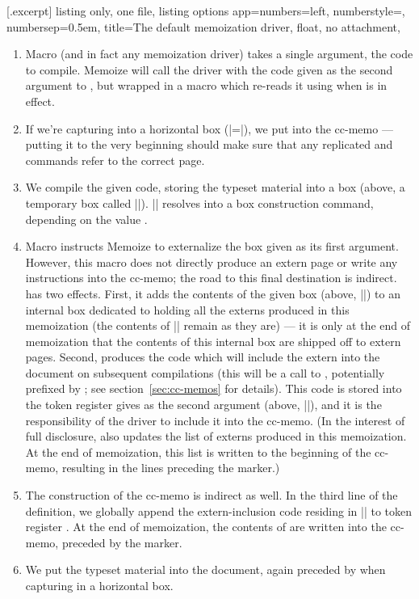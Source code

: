 \documentclass[a4paper,11pt]{article}
\begin{document}
[.excerpt]{%
  listing only, one file,
  listing options app={numbers=left, numberstyle=\tiny, numbersep=0.5em},
  title=The default memoization driver,
  float, no attachment,
}

\begin{enumerate}
\item Macro  (and in fact any memoization
  driver) takes a single argument, the code to compile.  Memoize will call the
  driver with the code given as the second argument to , but
  wrapped in a macro which re-reads it using  when
   is in effect.
\item If we're capturing into a horizontal box
  (|=|), we put  into
  the cc-memo --- putting it to the very beginning should make sure that any
  replicated  and  commands refer to the correct page.
\item We compile the given code, storing the typeset material into a box
  (above, a temporary box called |\mmz@box|).  |\mmz@capture| resolves into a
  box construction command, depending on the value .
\item Macro  instructs Memoize to externalize the box
  given as its first argument.  However, this macro does not directly produce
  an extern page or write any instructions into the cc-memo; the road to this
  final destination is indirect.   has two effects.
  First, it adds the contents of the given box (above, |\mmz@box|) to an
  internal box dedicated to holding all the externs produced in this
  memoization (the contents of |\mmz@box| remain as they are) --- it is only at
  the end of memoization that the contents of this internal box are shipped off
  to extern pages.  Second,  produces the code which
  will include the extern into the document on subsequent compilations (this
  will be a call to , potentially prefixed by
  ; see section~\ref{sec:cc-memos} for details).  This code
  is stored into the token register gives as the second argument (above,
  |\mmz@temptoks|), and it is the responsibility of the driver to include it
  into the cc-memo.  (In the interest of full disclosure,
   also updates the list of externs produced in this
  memoization.  At the end of memoization, this list is written to the
  beginning of the cc-memo, resulting in the  lines
  preceding the  marker.)
\item The construction of the cc-memo is indirect as well.  In the third line
  of the definition, we globally append the extern-inclusion code residing in
  |\mmz@temptoks| to token register .  At the end of
  memoization, the contents of  are written into the cc-memo,
  preceded by the  marker.
\item We put the typeset material into the document, again preceded by
   when capturing in a horizontal box.
\end{enumerate}
\end{document}
